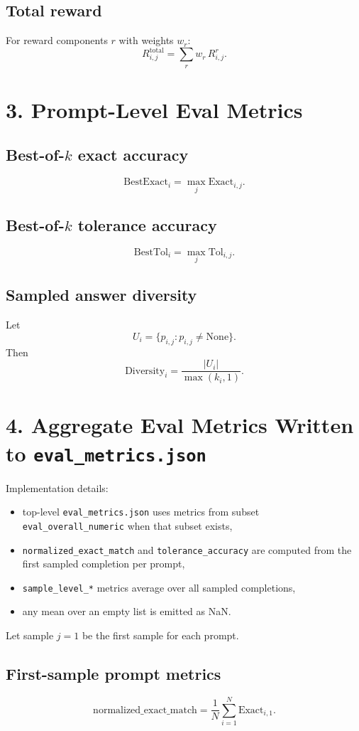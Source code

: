 \documentclass[11pt]{article}
\newcommand{\None}{\mathrm{None}}
\begin{document}
\subsection*{Total reward}
For reward components $r$ with weights $w_r$:
\[
R^{\mathrm{total}}_{i,j} = \sum_r w_r \, R^r_{i,j}.
\]

\section*{3. Prompt-Level Eval Metrics}

\subsection*{Best-of-$k$ exact accuracy}
\[
\mathrm{BestExact}_i = \max_j \mathrm{Exact}_{i,j}.
\]

\subsection*{Best-of-$k$ tolerance accuracy}
\[
\mathrm{BestTol}_i = \max_j \mathrm{Tol}_{i,j}.
\]

\subsection*{Sampled answer diversity}
Let
\[
U_i = \{ p_{i,j} : p_{i,j} \neq \None \}.
\]
Then
\[
\mathrm{Diversity}_i = \frac{|U_i|}{\max(k_i, 1)}.
\]

\section*{4. Aggregate Eval Metrics Written to \texttt{eval\_metrics.json}}
Implementation details:
\begin{itemize}
\item top-level \texttt{eval\_metrics.json} uses metrics from subset \texttt{eval\_overall\_numeric} when that subset exists,
\item \texttt{normalized\_exact\_match} and \texttt{tolerance\_accuracy} are computed from the first sampled completion per prompt,
\item \texttt{sample\_level\_*} metrics average over all sampled completions,
\item any mean over an empty list is emitted as NaN.
\end{itemize}

Let sample $j=1$ be the first sample for each prompt.

\subsection*{First-sample prompt metrics}
\[
\mathrm{normalized\_exact\_match}
=
\frac{1}{N}\sum_{i=1}^{N} \mathrm{Exact}_{i,1}.
\]
\end{document}
